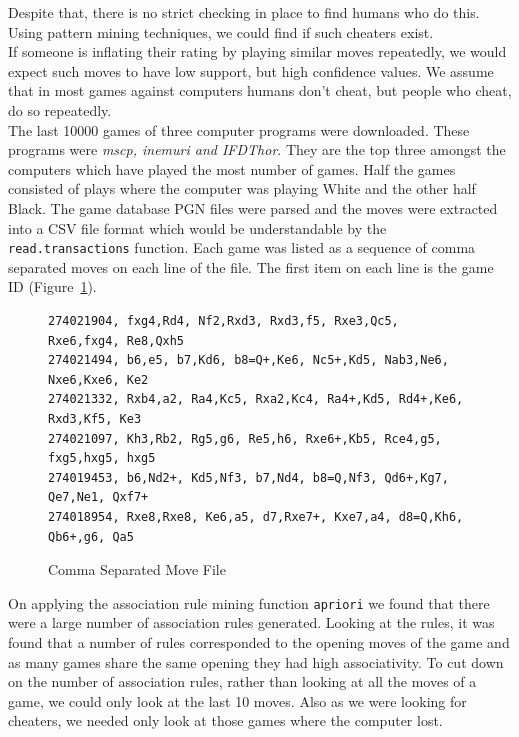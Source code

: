 \documentclass{article}
\begin{document}
Despite that, there is no strict checking in place to find humans who do this. Using pattern mining techniques, we could find if such cheaters exist.\\

If someone is inflating their rating by playing similar moves repeatedly, we would expect such moves to have low support, but  high confidence values. We assume that in most games against computers humans don't cheat, but people who cheat, do so repeatedly. \\

The last 10000 games of three computer programs were downloaded. These programs were {\sl mscp, inemuri and IFDThor}. They are the top three amongst the computers which have played the most number of games. Half the games consisted of plays where the computer was playing White and the other half Black. The game database PGN files were parsed and the moves were extracted into a CSV file format which would be understandable by the \verb=read.transactions= function. Each game was listed as a sequence of comma separated moves on each line of the file. The first item on each line is the game ID (Figure~\ref{fig:movecsv}).\\

\begin{figure}[htp]

\begin{verbatim}
274021904, fxg4,Rd4, Nf2,Rxd3, Rxd3,f5, Rxe3,Qc5, Rxe6,fxg4, Re8,Qxh5
274021494, b6,e5, b7,Kd6, b8=Q+,Ke6, Nc5+,Kd5, Nab3,Ne6, Nxe6,Kxe6, Ke2
274021332, Rxb4,a2, Ra4,Kc5, Rxa2,Kc4, Ra4+,Kd5, Rd4+,Ke6, Rxd3,Kf5, Ke3
274021097, Kh3,Rb2, Rg5,g6, Re5,h6, Rxe6+,Kb5, Rce4,g5, fxg5,hxg5, hxg5
274019453, b6,Nd2+, Kd5,Nf3, b7,Nd4, b8=Q,Nf3, Qd6+,Kg7, Qe7,Ne1, Qxf7+
274018954, Rxe8,Rxe8, Ke6,a5, d7,Rxe7+, Kxe7,a4, d8=Q,Kh6, Qb6+,g6, Qa5
\end{verbatim}
\caption{Comma Separated Move File}
\label{fig:movecsv}
\end{figure}


On applying the association rule mining function \verb=apriori= we found that there were a large number of association rules generated. Looking at the rules, it was found that a number of rules corresponded to the opening moves of the game and as many games share the same opening they had high associativity. To cut down on the number of association rules, rather than looking at all the moves of a game, we could only look at the last 10 moves. Also as we were looking for cheaters, we needed only look at those games where the computer lost.\\
\end{document}
